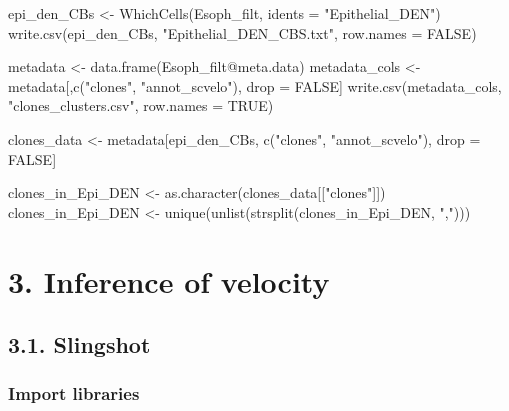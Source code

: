 \documentclass[
  letterpaper,
  DIV=11,
  numbers=noendperiod]{scrreprt}
\newenvironment{Shaded}{\begin{snugshade}}{\end{snugshade}}
\newcommand{\AttributeTok}[1]{\textcolor[rgb]{0.40,0.45,0.13}{#1}}
\newcommand{\ConstantTok}[1]{\textcolor[rgb]{0.56,0.35,0.01}{#1}}
\newcommand{\FunctionTok}[1]{\textcolor[rgb]{0.28,0.35,0.67}{#1}}
\newcommand{\NormalTok}[1]{\textcolor[rgb]{0.00,0.23,0.31}{#1}}
\newcommand{\OtherTok}[1]{\textcolor[rgb]{0.00,0.23,0.31}{#1}}
\newcommand{\SpecialCharTok}[1]{\textcolor[rgb]{0.37,0.37,0.37}{#1}}
\newcommand{\StringTok}[1]{\textcolor[rgb]{0.13,0.47,0.30}{#1}}
\begin{document}
\begin{Shaded}
\begin{Highlighting}[]
\NormalTok{epi\_den\_CBs }\OtherTok{\textless{}{-}} \FunctionTok{WhichCells}\NormalTok{(Esoph\_filt, }\AttributeTok{idents =} \StringTok{"Epithelial\_DEN"}\NormalTok{)}
\FunctionTok{write.csv}\NormalTok{(epi\_den\_CBs, }\StringTok{"Epithelial\_DEN\_CBS.txt"}\NormalTok{, }\AttributeTok{row.names =} \ConstantTok{FALSE}\NormalTok{)}

\NormalTok{metadata }\OtherTok{\textless{}{-}} \FunctionTok{data.frame}\NormalTok{(Esoph\_filt}\SpecialCharTok{@}\NormalTok{meta.data)}
\NormalTok{metadata\_cols }\OtherTok{\textless{}{-}}\NormalTok{ metadata[,}\FunctionTok{c}\NormalTok{(}\StringTok{"clones"}\NormalTok{, }\StringTok{"annot\_scvelo"}\NormalTok{), drop }\OtherTok{=} \ConstantTok{FALSE}\NormalTok{]}
\FunctionTok{write.csv}\NormalTok{(metadata\_cols, }\StringTok{"clones\_clusters.csv"}\NormalTok{, }\AttributeTok{row.names =} \ConstantTok{TRUE}\NormalTok{)}

\NormalTok{clones\_data }\OtherTok{\textless{}{-}}\NormalTok{ metadata[epi\_den\_CBs, }\FunctionTok{c}\NormalTok{(}\StringTok{"clones"}\NormalTok{, }\StringTok{"annot\_scvelo"}\NormalTok{), drop }\OtherTok{=} \ConstantTok{FALSE}\NormalTok{]}

\NormalTok{clones\_in\_Epi\_DEN }\OtherTok{\textless{}{-}} \FunctionTok{as.character}\NormalTok{(clones\_data[[}\StringTok{"clones"}\NormalTok{]])}
\NormalTok{clones\_in\_Epi\_DEN }\OtherTok{\textless{}{-}} \FunctionTok{unique}\NormalTok{(}\FunctionTok{unlist}\NormalTok{(}\FunctionTok{strsplit}\NormalTok{(clones\_in\_Epi\_DEN, }\StringTok{","}\NormalTok{)))}
\end{Highlighting}
\end{Shaded}

\chapter{3. Inference of velocity}\label{inference-of-velocity}

\section{3.1. Slingshot}\label{slingshot}

\subsection{Import libraries}\label{import-libraries-1}
\end{document}
